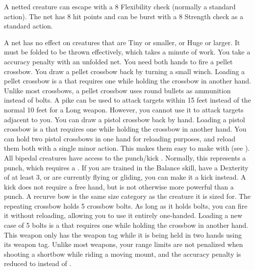     \par A netted creature can escape with a  8 Flexibility check (normally a standard action). The net has 8 hit points and can be burst with a  8 Strength check as a standard action.
    \par A net has no effect on creatures that are Tiny or smaller, or Huge or larger. It must be folded to be thrown effectively, which takes a minute of work. You take a  accuracy penalty with an unfolded net.
     You need both hands to fire a pellet crossbow.
    You draw a pellet crossbow back by turning a small winch.
    Loading a pellet crossbow is a  that requires one  while holding the crossbow in another hand.
    Unlike most crossbows, a pellet crossbow uses round bullets as ammunition instead of bolts.
     A pike can be used to attack targets within 15 feet instead of the normal 10 feet for a Long weapon.
    However, you cannot use it to attack targets adjacent to you.
     You can draw a pistol crossbow back by hand.
    Loading a pistol crossbow is a  that requires one  while holding the crossbow in another hand.
    You can hold two pistol crossbows in one hand for reloading purposes, and reload them both with a single minor action.
    This makes them easy to make  with (see ).
     All bipedal creatures have access to the punch/kick .
    Normally, this represents a punch, which requires a .
    If you are trained in the Balance skill, have a Dexterity of at least 3, or are currently flying or gliding, you can make it a kick instead.
    A kick does not require a free hand, but is not otherwise more powerful than a punch.
     A recurve bow is the same size category as the creature it is sized for.
     The repeating crossbow holds 5 crossbow bolts.
    As long as it holds bolts, you can fire it without reloading, allowing you to use it entirely one-handed.
    Loading a new case of 5 bolts is a  that requires one  while holding the crossbow in another hand.
     This weapon only has the  weapon tag while it is being held in two hands using its  weapon tag.
     Unlike most  weapons, your range limits are not penalized when shooting a shortbow while riding a moving mount, and the accuracy penalty is reduced to  instead of .
